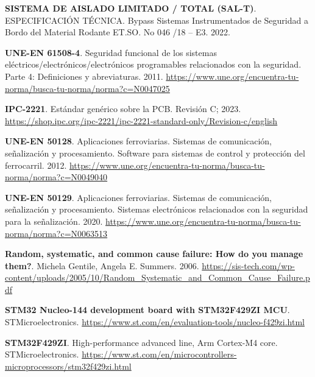 \begin{thebibliography}{30}
 \textbf{SISTEMA DE AISLADO LIMITADO / TOTAL (SAL-T)}. ESPECIFICACIÓN TÉCNICA. Bypass Sistemas Instrumentados de Seguridad a Bordo del Material Rodante ET.SO. No 046 /18 – E3. 2022.

  



\textbf{UNE-EN 61508-4}. Seguridad funcional de los sistemas eléctricos/electrónicos/electrónicos programables relacionados con la seguridad. Parte 4: Definiciones y abreviaturas. 2011. \href{https://www.une.org/encuentra-tu-norma/busca-tu-norma/norma?c=N0047025}{https://www.une.org/encuentra-tu-norma/busca-tu-norma/norma?c=N0047025} 

\textbf{IPC-2221}. Estándar genérico sobre la PCB. Revisión C; 2023. \href{https://shop.ipc.org/ipc-2221/ipc-2221-standard-only/Revision-c/english}{https://shop.ipc.org/ipc-2221/ipc-2221-standard-only/Revision-c/english}

\textbf{UNE-EN 50128}. Aplicaciones ferroviarias. Sistemas de comunicación, señalización y procesamiento. Software para sistemas de control y protección del ferrocarril. 2012. \href{https://www.une.org/encuentra-tu-norma/busca-tu-norma/norma?c=N0049040}{https://www.une.org/encuentra-tu-norma/busca-tu-norma/norma?c=N0049040} 



\textbf{UNE-EN 50129}. Aplicaciones ferroviarias. Sistemas de comunicación, señalización y procesamiento. Sistemas electrónicos relacionados con la seguridad para la señalización. 2020. \href{https://www.une.org/encuentra-tu-norma/busca-tu-norma/norma?c=N0063513}{https://www.une.org/encuentra-tu-norma/busca-tu-norma/norma?c=N0063513} 




\textbf{Random, systematic, and common cause failure: How do you manage them?}. Michela Gentile, Angela E. Summers. 2006. \href{https://sis-tech.com/wp-content/uploads/2005/10/Random_Systematic_and_Common_Cause_Failure.pdf}{https://sis-tech.com/wp-content/uploads/2005/10/Random\_Systematic\_and\_Common\_Cause\_Failure.pdf} 

\textbf{STM32 Nucleo-144 development board with STM32F429ZI MCU}. STMicroelectronics. \href{https://www.st.com/en/evaluation-tools/nucleo-f429zi.html}{https://www.st.com/en/evaluation-tools/nucleo-f429zi.html} 

\textbf{STM32F429ZI}. High-performance advanced line, Arm Cortex-M4 core. STMicroelectronics. \href{https://www.st.com/en/microcontrollers-microprocessors/stm32f429zi.html}{https://www.st.com/en/microcontrollers-microprocessors/stm32f429zi.html} 


\end{thebibliography}

